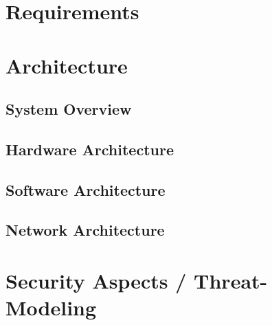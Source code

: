 \section{Requirements}

\section{Architecture}
\subsection{System Overview}

\subsection{Hardware Architecture}

\subsection{Software Architecture}

\subsection{Network Architecture}


\section{Security Aspects / Threat-Modeling}
